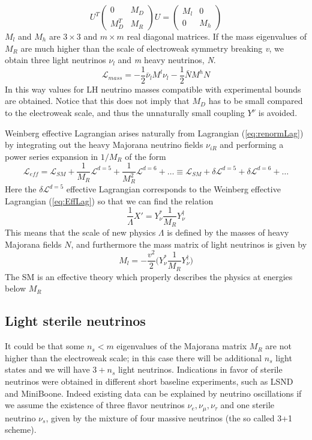 \documentclass{subnucbo}
\begin{document}
\begin{equation}
U^T\begin{pmatrix}0 & M_D\\ M_D^T & M_R\end{pmatrix}U=\begin{pmatrix}M_l & 0 \\ 0 & M_h\end{pmatrix}
\end{equation}
$M_l$ and $M_h$ are $3\times3$ and $m\times m$ real diagonal matrices. If the mass eigenvalues of $M_R$ are much higher than the scale of electroweak symmetry breaking \emph{v}, we obtain three light neutrinos $\nu_l$ and \emph{m} heavy neutrinos, \emph{N}.
\begin{equation}
\mathcal{L}_{mass}=-\frac{1}{2}\bar{\nu}_lM^l\nu_l-\frac{1}{2}\bar{N}M^hN
\end{equation}
In this way values for LH neutrino masses compatible with experimental bounds are obtained. Notice that this does not imply that $M_D$ has to be small compared to the electroweak scale, and thus the unnaturally small coupling $Y^{\nu}$ is avoided.

Weinberg effective Lagrangian arises naturally from Lagrangian (\ref{eq:renormLag}) by integrating out the heavy Majorana neutrino fields $\nu_{iR}$ and performing a power series expansion in $1/M_R$ of the form
\begin{equation}
\mathcal{L}_{eff}=\mathcal{L}_{SM}+\frac{1}{M_R}\mathcal{L}^{d=5}+\frac{1}{M_R^2}\mathcal{L}^{d=6}+\dots
\equiv \mathcal{L}_{SM}+\delta\mathcal{L}^{d=5}+\delta\mathcal{L}^{d=6}+\dots
\end{equation}
Here the $\delta\mathcal{L}^{d=5}$ effective Lagrangian corresponds to the Weinberg effective Lagrangian (\ref{eq:EffLag}) so that we can find the relation
\begin{equation}
\frac{1}{\Lambda}X'=Y^{*}_{\nu}\frac{1}{M_R}Y_{\nu}^{\dagger} %
\end{equation}
This means that the scale of new physics $\Lambda$ is defined by the masses of heavy Majorana fields $N$, and furthermore the mass matrix of light neutrinos is given by
\begin{equation}
M_l=-\frac{v^2}{2}\biggl(Y^{*}_{\nu}\frac{1}{M_R}Y_{\nu}^{\dagger}\biggr) 
\end{equation}
The SM is an effective theory which properly describes the physics at energies below $M_R$

\subsection{Light sterile neutrinos}
It could be that some $n_s<m$ eigenvalues of the Majorana matrix $M_R$ are not higher than the electroweak scale; in this case there will be additional $n_s$ light states and we will have $3+n_s$ light neutrinos.
Indications in favor of sterile neutrinos were obtained in different short baseline experiments, such as LSND %
and MiniBoone. %
Indeed existing data can be explained by neutrino oscillations if we assume the existence of three flavor neutrinos $\nu_e, \nu_{\mu}, \nu_{\tau}$ and one sterile neutrino $\nu_s$, given by the mixture of four massive neutrinos (the so called 3+1 scheme).
\end{document}

